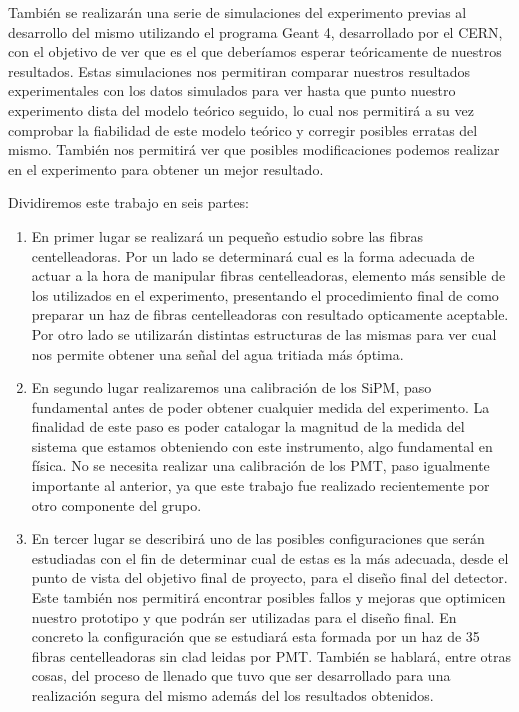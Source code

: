 También se realizarán una serie de simulaciones del experimento previas al desarrollo del mismo utilizando el programa Geant 4, desarrollado por el CERN, con el objetivo de ver que es el que deberíamos esperar teóricamente de nuestros resultados. Estas simulaciones nos permitiran comparar nuestros resultados experimentales con los datos simulados para ver hasta que punto nuestro experimento dista del modelo teórico seguido, lo cual nos permitirá a su vez comprobar la fiabilidad de este modelo teórico y corregir posibles erratas del mismo. También nos permitirá ver que posibles modificaciones podemos realizar en el experimento para obtener un mejor resultado.



Dividiremos este trabajo en seis partes:
\begin{enumerate}
\item{} En primer lugar se realizará un pequeño estudio sobre las fibras centelleadoras. Por un lado se determinará cual es la forma adecuada de actuar a la hora de manipular fibras centelleadoras, elemento más sensible de los utilizados en el experimento, presentando el procedimiento final de como preparar un haz de fibras centelleadoras con resultado opticamente aceptable. Por otro lado se utilizarán distintas estructuras de las mismas para ver cual nos permite obtener una señal del agua tritiada  más óptima. 

\item{} En segundo lugar realizaremos una calibración de los SiPM, paso fundamental antes de poder obtener cualquier medida del experimento. La finalidad de este paso es poder catalogar la magnitud de la medida del sistema que estamos obteniendo con este instrumento, algo fundamental en física. No se necesita realizar una calibración de los PMT, paso igualmente importante al anterior, ya que este trabajo fue realizado recientemente por otro componente del grupo.

\item{} En tercer lugar se describirá uno de las posibles configuraciones que serán estudiadas con el fin de determinar cual de estas es la más adecuada, desde el punto de vista del objetivo final de proyecto, para el diseño final del detector. Este también nos permitirá encontrar posibles fallos y mejoras que optimicen nuestro prototipo y que podrán ser utilizadas para el diseño final. En concreto la configuración que se estudiará esta formada por un haz de 35 fibras centelleadoras sin clad leidas por PMT. También se hablará, entre otras cosas, del proceso de llenado que tuvo que ser desarrollado para una realización segura del mismo además del los resultados obtenidos.


\end{enumerate}
